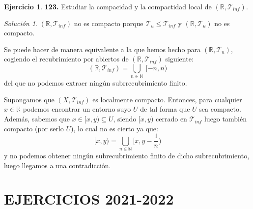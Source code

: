 \documentclass[12pt,twoside]{report}
\newcommand\mc[1]{\mathcal{#1}}
\theoremstyle{azul}
\theoremstyle{azul2}
\theoremstyle{plain}
\theoremstyle{definition}
\newtheorem*{ejer}{Ejercicio}
\theoremstyle{remark}
\newtheorem*{sol}{Solución}
\begin{document}
\begin{ejer}
    \textbf{123.} Estudiar la compacidad y la compactidad local de $(\mathbb{R}, \mc{T}_{inf})$. 
\end{ejer}
\begin{sol}
    $(\mathbb{R}, \mc{T}_{inf})$ no es compacto porque $\mc{T}_u \leq \mc{T}_{inf}$ y $(\mathbb{R}, \mc{T}_{u})$ no es compacto. 

Se puede hacer de manera equivalente a la que hemos hecho para $(\mathbb{R}, \mc{T}_{u})$, cogiendo el recubrimiento por abiertos de $(\mathbb{R}, \mc{T}_{inf})$ siguiente:
$$(\mathbb{R}, \mc{T}_{inf})=\bigcup_{n \in \mathbb{N}}\: [-n,n)$$
del que no podemos extraer ningún subrrecubrimiento finito. 

Supongamos que $(X,\mc{T}_{inf})$ es localmente compacto. Entonces, para cualquier $x\in\mathbb{R}$ podemos encontrar  un entorno suyo $U$ de tal forma que $U$ sea compacto. Además, sabemos que $x\in[x,y)\subseteq U$, siendo $[x,y)$ cerrado en $\mc{T}_{inf}$ luego también compacto (por serlo $U$), lo cual no es cierto ya que:
$$[x,y)=\underset{n\in \mathbb{N}}{\bigcup}[x,y-\frac{1}{n})$$
y no podemos obtener ningún subrecubrimiento finito de dicho subrecubrimiento, luego llegamos a una contradicción.

\end{sol}
\chapter{EJERCICIOS 2021-2022}
\end{document}

